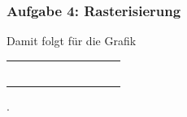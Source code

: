 \documentclass[accentcolor=tud9c,colorbacktitle,inverttitle,landscape,german,presentation,t]{tudbeamer}
\begin{document}
	\begin{frame}
	\frametitle{Aufgabe 4: Rasterisierung} 
	Damit folgt für die Grafik \\
	\centering
	\begin{tabular}{|*{10}{c|}}
		\hline
		& & & & & & & & & \\ %
		\hline
		& & & & & & & & \cellcolor{black} & \\ %
		\hline
		& & & & & & \cellcolor{black} & \cellcolor{black} & & \\ %
		\hline
		& & & & \cellcolor{black} & \cellcolor{black} & & & & \\ %
		\hline
		& & \cellcolor{black} & \cellcolor{black} & & & & & & \\ %
		\hline
		& \cellcolor{black} & & & & & & & & \\ %
		\hline
		& & & & & & & & & \\ %
		\hline
	\end{tabular}.
	\end{frame}
\end{document}
